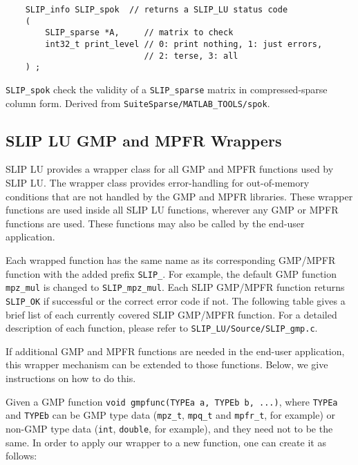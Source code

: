 \documentclass[12pt]{article}
\theoremstyle{definition}
\begin{document}
\begin{mdframed}[userdefinedwidth=6in]
{\footnotesize
\begin{verbatim}
    SLIP_info SLIP_spok  // returns a SLIP_LU status code
    (
        SLIP_sparse *A,     // matrix to check
        int32_t print_level // 0: print nothing, 1: just errors,
                            // 2: terse, 3: all
    ) ;
\end{verbatim}
} \end{mdframed}

\verb|SLIP_spok| check the validity of a \verb|SLIP_sparse| matrix in compressed-sparse column form.  Derived from \verb|SuiteSparse/MATLAB_TOOLS/spok|.

\subsection{SLIP LU GMP and MPFR Wrappers}

SLIP LU provides a wrapper class for all GMP and MPFR functions used by SLIP
LU.  The wrapper class provides error-handling for out-of-memory conditions
that are not handled by the GMP and MPFR libraries.  These wrapper functions
are used inside all SLIP LU functions, wherever any GMP or MPFR functions are
used.  These functions may also be called by the end-user application.

Each wrapped function has the same name as its corresponding GMP/MPFR function
with the added prefix \verb|SLIP_|. For example, the default GMP function
\verb|mpz_mul| is changed to \verb|SLIP_mpz_mul|. Each SLIP GMP/MPFR function
returns \verb|SLIP_OK| if successful or the correct error code if not. The
following table gives a brief list of each currently covered SLIP GMP/MPFR
function. For a detailed description of each function, please refer to
\verb|SLIP_LU/Source/SLIP_gmp.c|.

If additional GMP and MPFR functions are needed in the end-user application,
this wrapper mechanism can be extended to those functions.  Below, we give
instructions on how to do this.

Given a GMP function \verb|void gmpfunc(TYPEa a, TYPEb b, ...)|, where
\verb|TYPEa| and \verb|TYPEb| can be GMP type data (\verb|mpz_t|,
\verb|mpq_t| and \verb|mpfr_t|, for example) or non-GMP type data (\verb|int|,
\verb|double|, for example), and they need not to be the same. In order to
apply our wrapper to a new function, one can create it as follows:
\end{document}

